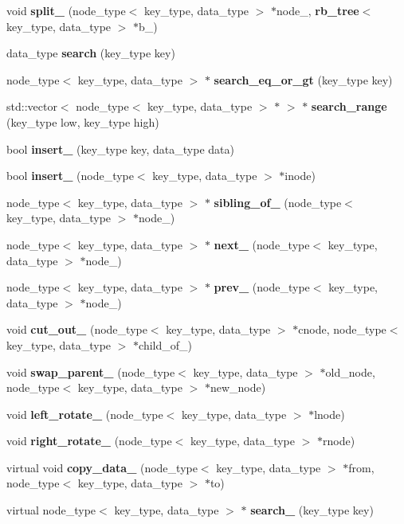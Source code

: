 \begin{DoxyCompactItemize}
\item 
void \textbf{ split\+\_\+} (node\+\_\+type$<$ key\+\_\+type, data\+\_\+type $>$ $\ast$node\+\_\+, \textbf{ rb\+\_\+tree}$<$ key\+\_\+type, data\+\_\+type $>$ $\ast$b\+\_\+)
\item 
data\+\_\+type \textbf{ search} (key\+\_\+type key)
\item 
node\+\_\+type$<$ key\+\_\+type, data\+\_\+type $>$ $\ast$ \textbf{ search\+\_\+eq\+\_\+or\+\_\+gt} (key\+\_\+type key)
\item 
std\+::vector$<$ node\+\_\+type$<$ key\+\_\+type, data\+\_\+type $>$ $\ast$ $>$ $\ast$ \textbf{ search\+\_\+range} (key\+\_\+type low, key\+\_\+type high)
\item 
bool \textbf{ insert\+\_\+} (key\+\_\+type key, data\+\_\+type data)
\item 
bool \textbf{ insert\+\_\+} (node\+\_\+type$<$ key\+\_\+type, data\+\_\+type $>$ $\ast$inode)
\item 
node\+\_\+type$<$ key\+\_\+type, data\+\_\+type $>$ $\ast$ \textbf{ sibling\+\_\+of\+\_\+} (node\+\_\+type$<$ key\+\_\+type, data\+\_\+type $>$ $\ast$node\+\_\+)
\item 
node\+\_\+type$<$ key\+\_\+type, data\+\_\+type $>$ $\ast$ \textbf{ next\+\_\+} (node\+\_\+type$<$ key\+\_\+type, data\+\_\+type $>$ $\ast$node\+\_\+)
\item 
node\+\_\+type$<$ key\+\_\+type, data\+\_\+type $>$ $\ast$ \textbf{ prev\+\_\+} (node\+\_\+type$<$ key\+\_\+type, data\+\_\+type $>$ $\ast$node\+\_\+)
\item 
void \textbf{ cut\+\_\+out\+\_\+} (node\+\_\+type$<$ key\+\_\+type, data\+\_\+type $>$ $\ast$cnode, node\+\_\+type$<$ key\+\_\+type, data\+\_\+type $>$ $\ast$child\+\_\+of\+\_\+)
\item 
void \textbf{ swap\+\_\+parent\+\_\+} (node\+\_\+type$<$ key\+\_\+type, data\+\_\+type $>$ $\ast$old\+\_\+node, node\+\_\+type$<$ key\+\_\+type, data\+\_\+type $>$ $\ast$new\+\_\+node)
\item 
void \textbf{ left\+\_\+rotate\+\_\+} (node\+\_\+type$<$ key\+\_\+type, data\+\_\+type $>$ $\ast$lnode)
\item 
void \textbf{ right\+\_\+rotate\+\_\+} (node\+\_\+type$<$ key\+\_\+type, data\+\_\+type $>$ $\ast$rnode)
\item 
virtual void \textbf{ copy\+\_\+data\+\_\+} (node\+\_\+type$<$ key\+\_\+type, data\+\_\+type $>$ $\ast$from, node\+\_\+type$<$ key\+\_\+type, data\+\_\+type $>$ $\ast$to)
\item 
virtual node\+\_\+type$<$ key\+\_\+type, data\+\_\+type $>$ $\ast$ \textbf{ search\+\_\+} (key\+\_\+type key)

\end{DoxyCompactItemize}
